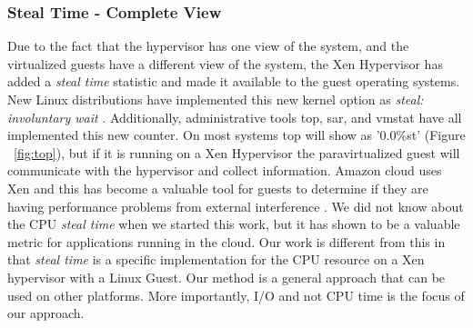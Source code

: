 \subsubsection{Steal Time - Complete View}
Due to the fact that the hypervisor has one view of the system, and the virtualized guests have a different view of the system, the Xen Hypervisor has added a \emph{steal time} statistic and made it available to the guest operating systems.  New Linux distributions have implemented this new kernel option as \emph{steal: involuntary wait} \cite{proc}.  Additionally, administrative tools top, sar, and vmstat have all implemented this new counter.  
On most systems top will show as '0.0\%st' (Figure ~\ref{fig:top}), but if it is running on a Xen Hypervisor the paravirtualized guest will communicate with the hypervisor and collect information. Amazon cloud uses Xen and this has become a valuable tool for guests to determine if they are having performance problems from external interference \cite{netflix}.
 We did not know about the CPU \emph{steal time} when we started this work, but it has shown to be a valuable metric for applications running in the cloud. 
Our work is different from this in that \emph{steal time} is a specific implementation for the CPU resource on a Xen hypervisor with a Linux Guest.  Our method is a general approach that can be used on other platforms.  More importantly, I/O and not CPU time is the focus of our approach.

